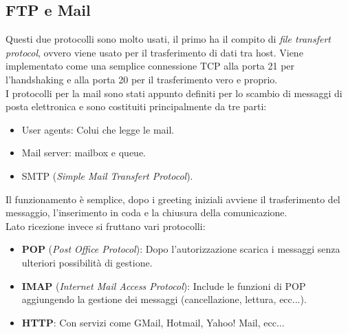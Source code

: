 \documentclass[12pt]{article}
\begin{document}
\subsection{FTP e Mail}
Questi due protocolli sono molto usati, il primo ha il compito di \textit{file transfert protocol}, ovvero viene usato per il trasferimento di dati tra host. Viene implementato come una semplice connessione TCP alla porta 21 per l'handshaking e alla porta 20 per il trasferimento vero e proprio.\\
I protocolli per la mail sono stati appunto definiti per lo scambio di messaggi di posta elettronica e sono costituiti principalmente da tre parti:
\begin{itemize}
  \item User agents: Colui che legge le mail.
  \item Mail server: mailbox e queue.
  \item SMTP (\textit{Simple Mail Transfert Protocol}).
\end{itemize}
Il funzionamento è semplice, dopo i greeting iniziali avviene il trasferimento del messaggio, l'inserimento in coda e la chiusura della comunicazione.\\
Lato ricezione invece si fruttano vari protocolli:
\begin{itemize}
  \item \textbf{POP} (\textit{Post Office Protocol}): Dopo l'autorizzazione scarica i messaggi senza ulteriori possibilità di gestione.
  \item \textbf{IMAP} (\textit{Internet Mail Access Protocol}): Include le funzioni di POP aggiungendo la gestione dei messaggi (cancellazione, lettura, ecc...).
  \item \textbf{HTTP}: Con servizi come GMail, Hotmail, Yahoo! Mail, ecc...
\end{itemize}



\end{document}
